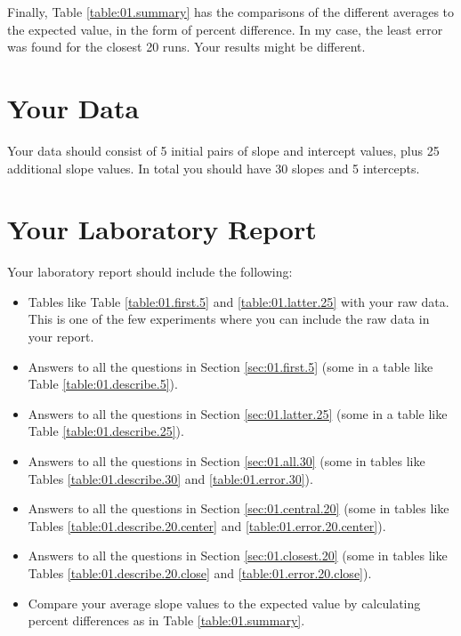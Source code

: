 Finally, Table \ref{table:01.summary} has the comparisons of the different averages to the expected value, in the form of percent difference. In my case, the least error was found for the closest 20 runs. Your results might be different.
\section{Your Data}
Your data should consist of 5 initial pairs of slope and intercept values, plus 25 additional slope values. In total you should have 30 slopes and 5 intercepts.
\newpage
\section{Your Laboratory Report}
Your laboratory report should include the following:
\begin{itemize}
    \item Tables like Table \ref{table:01.first.5} and \ref{table:01.latter.25} with your raw data. This is one of the few experiments where you can include the raw data in your report.
    \item Answers to all the questions in Section \ref{sec:01.first.5} (some in a table like Table \ref{table:01.describe.5}).
    \item Answers to all the questions in Section \ref{sec:01.latter.25} (some in a table like Table \ref{table:01.describe.25}).
    \item Answers to all the questions in Section \ref{sec:01.all.30} (some in tables like Tables \ref{table:01.describe.30} and \ref{table:01.error.30}).
    \item Answers to all the questions in Section \ref{sec:01.central.20} (some in tables like Tables \ref{table:01.describe.20.center} and \ref{table:01.error.20.center}).
    \item Answers to all the questions in Section \ref{sec:01.closest.20} (some in tables like Tables \ref{table:01.describe.20.close} and \ref{table:01.error.20.close}).
    \item Compare your average slope values to the expected value by calculating percent differences as in Table \ref{table:01.summary}.
\end{itemize}
